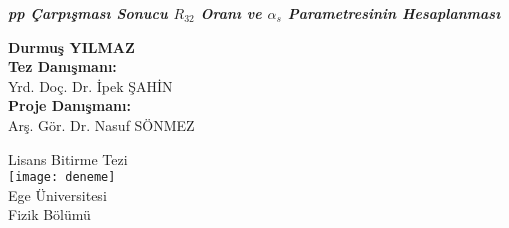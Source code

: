 \begin{titlepage}


\begin{center}


       \vspace*{3cm}
              
        \textbf{\huge \emph{ pp Çarpışması Sonucu $R_{32}$ Oranı ve $\alpha_s$ Parametresinin Hesaplanması}}
        
        
        \vspace{2.5cm}
        
        \textbf{Durmuş YILMAZ}\\[4em]
		\centering
        \textbf{Tez Danışmanı:} \\
       	Yrd. Doç. Dr. İpek ŞAHİN\\
       	\textbf{Proje Danışmanı:}\\
       	Arş. Gör. Dr. Nasuf SÖNMEZ\\
       	 
        \vfill
        
        Lisans Bitirme Tezi\\[4em]



        
        
       
        

 
			
		\texttt{[image: deneme]} \\
		Ege Üniversitesi\\
		Fizik Bölümü\\
		 
		  
		  \vspace*{3cm}
		  
		  
		
     \end{center}   
  \end{titlepage}